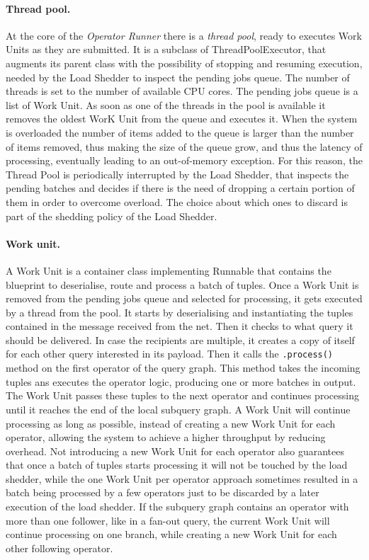 \paragraph{Thread pool.}
At the core of the \emph{Operator Runner} there is a \emph{thread pool}, ready to executes Work Units as
they are submitted. It is a subclass of ThreadPoolExecutor, that augments its parent class with the
possibility of stopping and resuming execution, needed by the Load Shedder to inspect the pending jobs
queue. The number of threads is set to the number of available CPU cores. The pending jobs queue is a
list of Work Unit. As soon as one of the threads in the pool is available it removes the oldest WorK Unit
from the queue and executes it. When the system is overloaded the number of items added to the queue is
larger than the number of items removed, thus making the size of the queue grow, and thus the latency of
processing, eventually leading to an out-of-memory exception. For this reason, the Thread Pool is
periodically interrupted by the Load Shedder, that inspects the pending batches and decides if there is
the need of dropping a certain portion of them in order to overcome overload. The choice about which ones
to discard is part of the shedding policy of the Load Shedder.

\paragraph{Work unit.}
A Work Unit is a container class implementing Runnable that contains the blueprint to deserialise, route
and process a batch of tuples. Once a Work Unit is removed from the pending jobs queue and selected
for processing, it gets executed by a thread from the pool. 
It starts by deserialising and instantiating the tuples contained in the message received
from the net. Then it checks to what query it should be delivered. In case the recipients are multiple,
it creates a copy of itself for each other query interested in its payload. Then it calls the
\texttt{.process()} method on the first operator of the query graph. This method takes the incoming
tuples ans executes the operator logic, producing one or more batches in output. The Work Unit passes
these tuples to the next operator and continues processing until it reaches the end of the local subquery
graph. A Work Unit will continue processing as long as possible, instead of creating a
new Work Unit for each operator, allowing the system to achieve a higher throughput by reducing overhead.
Not introducing a new Work Unit for each operator also guarantees that once a batch of tuples starts
processing it will not be touched by the load shedder, while the one Work Unit per operator approach
sometimes resulted in a batch being processed by a few operators just to be discarded by a later
execution of the load shedder. If the subquery graph contains an operator with more than one follower,
like in a fan-out query, the current Work Unit will continue processing on one branch, while creating a
new Work Unit for each other following operator. 


